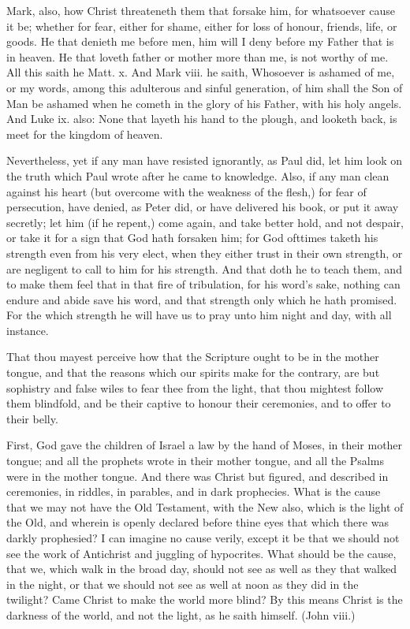 Mark, also, how Christ threateneth them that 
forsake him, for whatsoever cause it be; whether 
for fear, either for shame, either for loss of 
honour, friends, life, or goods. He that denieth 
me before men, him will I deny before my 
Father that is in heaven. He that loveth father 
or mother more than me, is not worthy of me. 
All this saith he Matt. x. And Mark viii. he 
saith, Whosoever is ashamed of me, or my
words, among this adulterous and sinful generation,
of him shall the Son of Man be ashamed 
when he cometh in the glory of his Father, with 
his holy angels. And Luke ix. also: None 
that layeth his hand to the plough, and looketh 
back, is meet for the kingdom of heaven.

Nevertheless, yet if any man have resisted 
ignorantly, as Paul did, let him look on the 
truth which Paul wrote after he came to knowledge.
Also, if any man clean against his heart 
(but overcome with the weakness of the flesh,) 
for fear of persecution, have denied, as Peter 
did, or have delivered his book, or put it away 
secretly; let him (if he repent,) come again, and 
take better hold, and not despair, or take it for a 
sign that God hath forsaken him; for God ofttimes
taketh his strength even from his very elect, 
when they either trust in their own strength, or 
are negligent to call to him for his strength. And 
that doth he to teach them, and to make them 
feel that in that fire of tribulation, for his word's 
sake, nothing can endure and abide save his 
word, and that strength only which he hath promised.
For the which strength he will have us to 
pray unto him night and day, with all instance. 

That thou mayest perceive how that the Scripture
ought to be in the mother tongue, and that 
the reasons which our spirits make for the contrary,
are but sophistry and false wiles to fear 
thee from the light, that thou mightest follow 
them blindfold, and be their captive to honour 
their ceremonies, and to offer to their belly. 

First, God gave the children of Israel a law 
by the hand of Moses, in their mother tongue;
and all the prophets wrote in their mother 
tongue, and all the Psalms were in the mother 
tongue. And there was Christ but figured, and described
in ceremonies, in riddles, in parables, and 
in dark prophecies. What is the cause that we 
may not have the Old Testament, with the New 
also, which is the light of the Old, and wherein 
is openly declared before thine eyes that which 
there was darkly prophesied? I can imagine no 
cause verily, except it be that we should not see 
the work of Antichrist and juggling of hypocrites. 
What should be the cause, that we, which walk 
in the broad day, should not see as well as they 
that walked in the night, or that we should not 
see as well at noon as they did in the twilight?
Came Christ to make the world more blind? By 
this means Christ is the darkness of the world, 
and not the light, as he saith himself. (John viii.)

